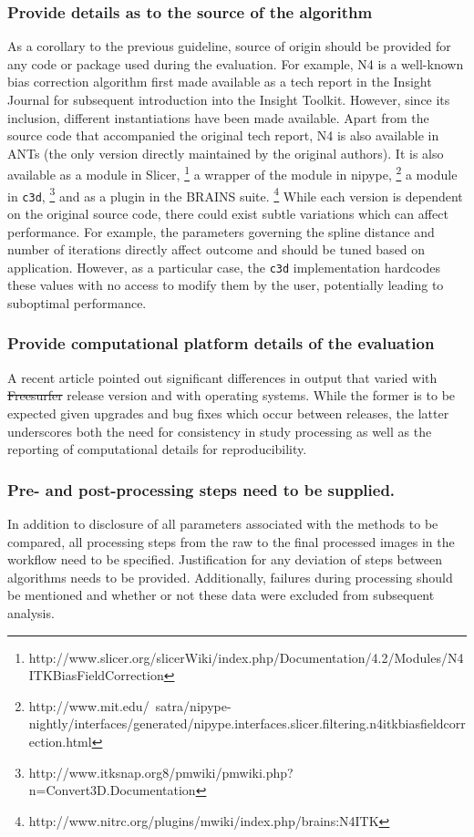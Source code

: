 \documentclass[final,5p,times,twocolumn]{elsarticle}
\newcommand{\trEdit}[1]{{\color{blue}{#1}}}
\newcommand{\trDelete}[1]{{\color{blue}\sout{#1}}}
\begin{document}
\subsubsection{Provide details as to the source of the algorithm}
As a corollary to the previous guideline, source of origin
should be provided for any code or package used during the
evaluation.  For example, N4 \cite{tustison2010} is a well-known 
bias correction algorithm first made available as a tech report
in the Insight Journal \cite{tustison2009a} for subsequent introduction
into the Insight Toolkit.  However, since
its inclusion, different instantiations have been made available.  
Apart from the source code that accompanied the original tech
report, N4 is also available in ANTs (the only version directly maintained
by the original authors).
It is also available as a module in Slicer,%
\footnote{
http://www.slicer.org/slicerWiki/index.php/Documentation/4.2/Modules/N4ITKBiasFieldCorrection
}
a wrapper of the \trEdit{Slicer} module in nipype,%
\footnote{
http://www.mit.edu/~satra/nipype-nightly/interfaces/generated/nipype.interfaces.slicer.filtering.n4itkbiasfieldcorrection.html
}
a module in \verb#c3d#,%
\footnote{
http://www.itksnap.org8/pmwiki/pmwiki.php?n=Convert3D.Documentation
}
and as a plugin in the BRAINS suite.%
\footnote{
http://www.nitrc.org/plugins/mwiki/index.php/brains:N4ITK
}
While each version is dependent on the original source
code, there could exist subtle variations which can affect performance.
For example, the parameters governing the spline distance and 
number of iterations directly affect outcome and should be tuned
based on application.  However, as a particular case, the \verb#c3d# 
implementation hard\trEdit{-}codes
these values with no access to modify them by the user, potentially
leading to suboptimal performance.

\subsubsection{Provide computational platform details of the evaluation}
A recent article \cite{gronenschild2012} pointed out significant
differences in \trEdit{FreeSurfer} output that varied with \trDelete{Freesurfer} release
version and with operating systems.  While the former is to be
expected given upgrades and bug fixes which occur between releases,
the latter underscores both the need for consistency in study processing
as well as the reporting of computational details for reproducibility. 

\subsubsection{Pre- and post-processing steps need to be supplied.}
In addition to disclosure of all parameters associated with the
methods to be compared, all processing steps from the raw 
to the final processed images in the workflow
need to be specified.    Justification for any deviation
of steps between algorithms needs to be provided.  Additionally,
failures during processing should be mentioned and whether
or not these data were excluded from subsequent analysis.  
\end{document}

